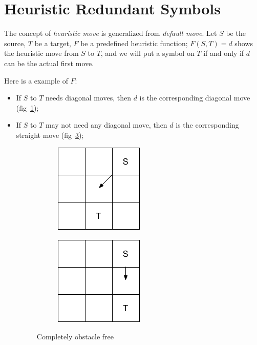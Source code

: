 \section{Heuristic Redundant Symbols}
\label{sec:hmoves}

The concept of
\textit{heuristic move} is generalized from \textit{default move}.
Let $S$ be the source, $T$ be a target, $F$ be a predefined heuristic function;
$F(S, T)=d$ shows the heuristic move from $S$ to $T$,
and we will put a \heur{} symbol on $T$ if and only if $d$ can be the actual first move. 

Here is a example of $F$:
\begin{itemize}
  \item If $S$ to $T$ needs diagonal moves, then $d$ is the corresponding diagonal move (fig~\ref{hmove1_1});

  \item If $S$ to $T$ may not need any diagonal move, then $d$ is the corresponding straight move (fig~\ref{hmove1_2});

    \begin{figure}[h]
      \centering
      \begin{subfigure}{.35\columnwidth}
      \centering
      \includegraphics[width=.6\columnwidth]{./hmove1.png}
        \caption{}
        \label{hmove1_1}
      \end{subfigure}%
      \begin{subfigure}{.35\columnwidth}
      \includegraphics[width=.6\columnwidth]{./hmove1_2.png}
      \centering
        \caption{}
        \label{hmove1_2}
      \end{subfigure}
      \caption{\small Completely obstacle free}
    \end{figure}


\end{itemize}

